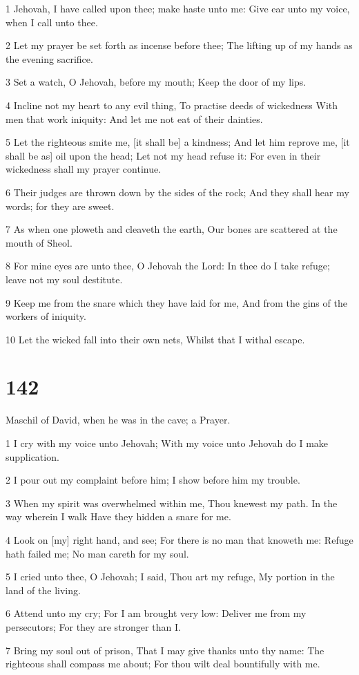 \par 1 Jehovah, I have called upon thee; make haste unto me: Give ear unto my voice, when I call unto thee.
\par 2 Let my prayer be set forth as incense before thee; The lifting up of my hands as the evening sacrifice.
\par 3 Set a watch, O Jehovah, before my mouth; Keep the door of my lips.
\par 4 Incline not my heart to any evil thing, To practise deeds of wickedness With men that work iniquity: And let me not eat of their dainties.
\par 5 Let the righteous smite me, [it shall be] a kindness; And let him reprove me, [it shall be as] oil upon the head; Let not my head refuse it: For even in their wickedness shall my prayer continue.
\par 6 Their judges are thrown down by the sides of the rock; And they shall hear my words; for they are sweet.
\par 7 As when one ploweth and cleaveth the earth, Our bones are scattered at the mouth of Sheol.
\par 8 For mine eyes are unto thee, O Jehovah the Lord: In thee do I take refuge; leave not my soul destitute.
\par 9 Keep me from the snare which they have laid for me, And from the gins of the workers of iniquity.
\par 10 Let the wicked fall into their own nets, Whilst that I withal escape.

\chapter{142}

\par Maschil of David, when he was in the cave; a Prayer.

\par 1 I cry with my voice unto Jehovah; With my voice unto Jehovah do I make supplication.
\par 2 I pour out my complaint before him; I show before him my trouble.
\par 3 When my spirit was overwhelmed within me, Thou knewest my path. In the way wherein I walk Have they hidden a snare for me.
\par 4 Look on [my] right hand, and see; For there is no man that knoweth me: Refuge hath failed me; No man careth for my soul.
\par 5 I cried unto thee, O Jehovah; I said, Thou art my refuge, My portion in the land of the living.
\par 6 Attend unto my cry; For I am brought very low: Deliver me from my persecutors; For they are stronger than I.
\par 7 Bring my soul out of prison, That I may give thanks unto thy name: The righteous shall compass me about; For thou wilt deal bountifully with me.

